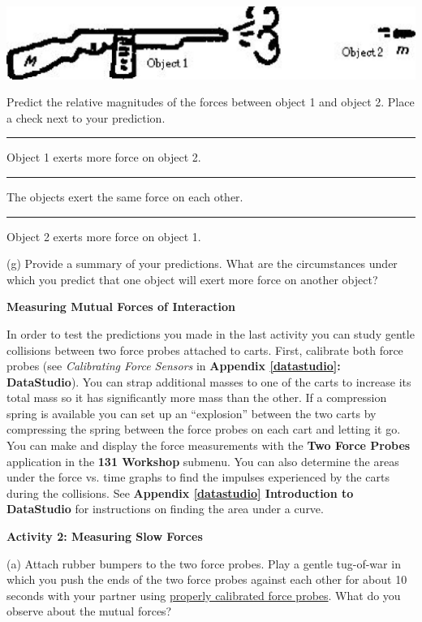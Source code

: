 \vspace{0.3cm}
{\par\centering \includegraphics{newtons_laws/newtons_laws_fig6.eps} \par}
\vspace{0.3cm}

Predict the relative magnitudes of the forces between object 1 and object 2.
Place a check next to your prediction. 

\rule{0.5in}{0.1pt} Object 1 exerts more force on object 2. 

\rule{0.5in}{0.1pt} The objects exert the same force on each other. 

\rule{0.5in}{0.1pt} Object 2 exerts more force on object 1.

(g) Provide a summary of your predictions. What are the circumstances under
which you predict that one object will exert more force on another object?
\vspace{30mm}

\textbf{Measuring Mutual Forces of Interaction }

In order to test the predictions you made in the last activity you can study
gentle collisions between two force probes attached to carts. First, calibrate both force probes 
(see \textit{Calibrating Force Sensors} in \textbf{Appendix \ref{datastudio}: DataStudio}). You can strap
additional masses to one of the carts to increase its total mass so it has significantly
more mass than the other. If a compression spring is available you can set up
an ``explosion'' between the two carts by compressing the spring
between the force probes on each cart and letting it go. You can make and display the force measurements with the \textbf{Two Force Probes} application in the \textbf{131 Workshop} submenu. You can also determine the areas under the force vs. time graphs to find the impulses experienced by the carts during the collisions. See \textbf{Appendix \ref{datastudio} Introduction to DataStudio}
for instructions on finding the area under a curve.

\textbf{Activity 2: Measuring Slow Forces} 

(a) Attach rubber bumpers to the two force probes. Play a gentle tug-of-war in which you push the ends of the two force probes against each other for about 10 seconds with your partner using 
\underline{properly calibrated force probes}. What do you observe about the mutual forces?
\vspace{20mm}

